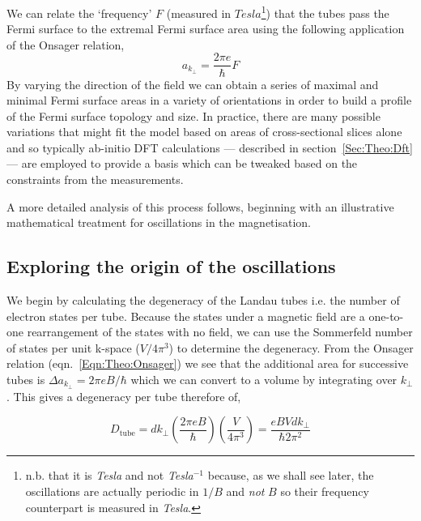  We can relate the `frequency' $F$ (measured in $Tesla$\footnote{n.b. that it is \emph{Tesla} and not \emph{Tesla$^{-1}$} because, as we shall see later, the oscillations are actually periodic in $1/B$ and \emph{not} $B$ so their frequency counterpart is measured in \emph{Tesla}.}) that the tubes pass the Fermi surface to the extremal Fermi surface area using the following application of the Onsager relation,
\begin{equation}
\textit{a}_{k_{\perp}} = \frac{2\pi e }{\hbar}F
\label{Eqn:Theo:AreaFreqRelation}
\end{equation}
By varying the direction of the field we can obtain a series of maximal and minimal Fermi surface areas in a variety of orientations in order to build a profile of the Fermi surface topology and size. In practice, there are many possible variations that might fit the model based on areas of cross-sectional slices alone and so typically ab-initio \ac{DFT} calculations --- described in section~\ref{Sec:Theo:Dft} --- are employed to provide a basis which can be tweaked based on the constraints from the measurements. 

A more detailed analysis of this process follows, beginning with an illustrative mathematical treatment for oscillations in the magnetisation.

\subsection{Exploring the origin of the oscillations}
    \label{Sec:Theo:ToyEqn}

We begin by calculating the degeneracy of the Landau tubes i.e. the number of electron states per tube. Because the states under a magnetic field are a one-to-one rearrangement of the states with no field, we can use the Sommerfeld number of states per unit k-space ($V/4\pi^3$) to determine the degeneracy. From the Onsager relation (eqn.~\ref{Eqn:Theo:Onsager}) we see that the additional area for successive tubes is $\Delta a_{k_{\perp}}  = 2\pi e B/\hbar$ which we can convert to a volume by integrating over $k_{\perp}$. This gives a degeneracy per tube therefore of,

\begin{equation}
D_{\textrm{tube}} = d k_{\perp}\left(\frac{2\pi e B}{\hbar}\right)\left(\frac{V}{4 \pi^3}\right) = \frac{eBVdk_{\perp}}{\hbar 2\pi^2}
\end{equation}

